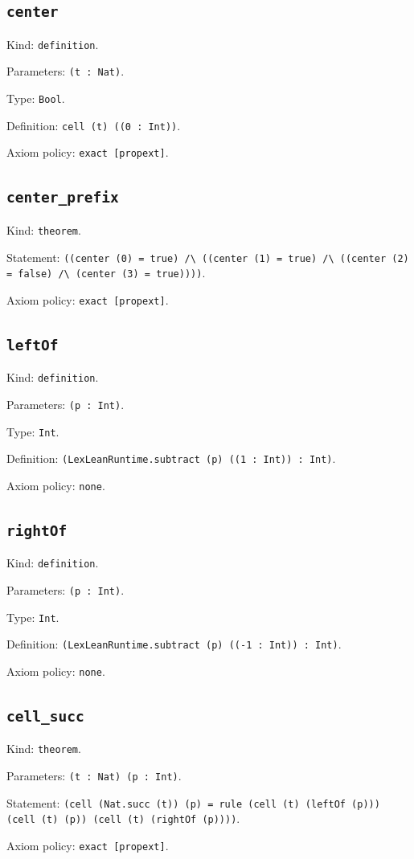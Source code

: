 \documentclass[11pt]{article}
\begin{document}
\subsection*{\texttt{center}}
\noindent Kind: \texttt{definition}.\par
\noindent Parameters: \texttt{(t : Nat)}.\par
\noindent Type: \texttt{Bool}.\par
\noindent Definition: \texttt{cell (t) ((0 : Int))}.\par
\noindent Axiom policy: \texttt{exact [propext]}.\par
\subsection*{\texttt{center\_prefix}}
\noindent Kind: \texttt{theorem}.\par
\noindent Statement: \texttt{((center (0) = true) /\textbackslash{} ((center (1) = true) /\textbackslash{} ((center (2) = false) /\textbackslash{} (center (3) = true))))}.\par
\noindent Axiom policy: \texttt{exact [propext]}.\par
\subsection*{\texttt{leftOf}}
\noindent Kind: \texttt{definition}.\par
\noindent Parameters: \texttt{(p : Int)}.\par
\noindent Type: \texttt{Int}.\par
\noindent Definition: \texttt{(LexLeanRuntime.subtract (p) ((1 : Int)) : Int)}.\par
\noindent Axiom policy: \texttt{none}.\par
\subsection*{\texttt{rightOf}}
\noindent Kind: \texttt{definition}.\par
\noindent Parameters: \texttt{(p : Int)}.\par
\noindent Type: \texttt{Int}.\par
\noindent Definition: \texttt{(LexLeanRuntime.subtract (p) ((-1 : Int)) : Int)}.\par
\noindent Axiom policy: \texttt{none}.\par
\subsection*{\texttt{cell\_succ}}
\noindent Kind: \texttt{theorem}.\par
\noindent Parameters: \texttt{(t : Nat) (p : Int)}.\par
\noindent Statement: \texttt{(cell (Nat.succ (t)) (p) = rule (cell (t) (leftOf (p))) (cell (t) (p)) (cell (t) (rightOf (p))))}.\par
\noindent Axiom policy: \texttt{exact [propext]}.\par
\end{document}
